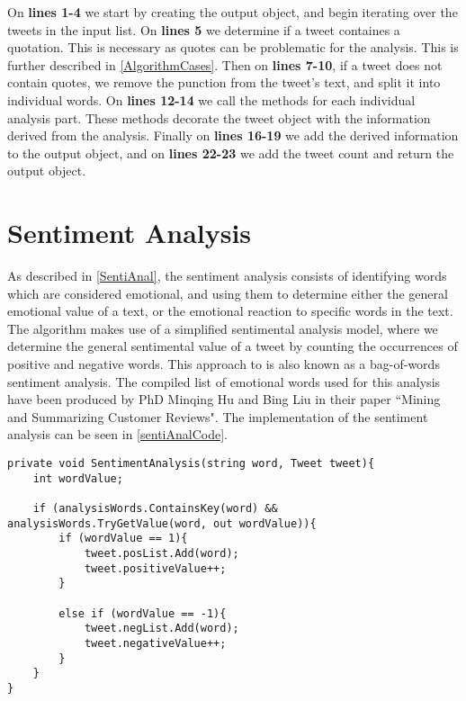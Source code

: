 On \textbf{lines 1-4} we start by creating the output object, and begin
iterating over the tweets in the input list. On \textbf{lines 5} we
determine if a tweet containes a quotation. This is necessary as quotes can be
problematic for the analysis. This is further described in
\autoref{AlgorithmCases}. Then on \textbf{lines 7-10}, if a tweet does not
contain quotes, we remove the punction from the tweet's text, and split it into
individual words. On \textbf{lines 12-14} we call the methods for each
individual analysis part. These methods decorate the tweet object with the
information derived from the analysis. Finally on \textbf{lines 16-19} we add
the derived information to the output object, and on \textbf{lines 22-23} we add
the tweet count and return the output object.

\section{Sentiment Analysis}
As described in \autoref{SentiAnal}, the sentiment analysis consists of
identifying words which are considered emotional, and using them to determine
either the general emotional value of a text, or the emotional reaction to
specific words in the text. The algorithm makes use of a simplified sentimental
analysis model, where we determine the general sentimental value of a tweet by
counting the occurrences of positive and negative words. This approach to is
also known as a bag-of-words sentiment analysis\citep{bagSentiment}. The
compiled list of emotional words used for this analysis have been produced by
PhD Minqing Hu and Bing Liu in their paper ``Mining and Summarizing Customer
Reviews"\citep{Hu:2004:MSC:1014052.1014073}. The implementation of the sentiment
analysis can be seen in \autoref{sentiAnalCode}.\\

\begin{minipage}[H]{\linewidth}
\begin{lstlisting}[caption = Determining the sentiment of a tweet , label = sentiAnalCode] 
private void SentimentAnalysis(string word, Tweet tweet){
	int wordValue;

    if (analysisWords.ContainsKey(word) && analysisWords.TryGetValue(word, out wordValue)){
    	if (wordValue == 1){
        	tweet.posList.Add(word);
            tweet.positiveValue++;
        }

        else if (wordValue == -1){
        	tweet.negList.Add(word);
            tweet.negativeValue++;
        }
    }
}
\end{lstlisting}
\end{minipage}

